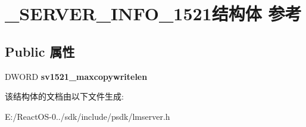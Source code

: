 \hypertarget{struct___s_e_r_v_e_r___i_n_f_o__1521}{}\section{\+\_\+\+S\+E\+R\+V\+E\+R\+\_\+\+I\+N\+F\+O\+\_\+1521结构体 参考}
\label{struct___s_e_r_v_e_r___i_n_f_o__1521}
\subsection*{Public 属性}
\begin{DoxyCompactItemize}
\item 
\mbox{\label{struct___s_e_r_v_e_r___i_n_f_o__1521_a5a6c5fc7c1ca4d2032a439799c9c4671}} 
D\+W\+O\+RD {\bfseries sv1521\+\_\+maxcopywritelen}
\end{DoxyCompactItemize}


该结构体的文档由以下文件生成\+:\begin{DoxyCompactItemize}
\item 
E\+:/\+React\+O\+S-\/0../sdk/include/psdk/lmserver.\+h\end{DoxyCompactItemize}
